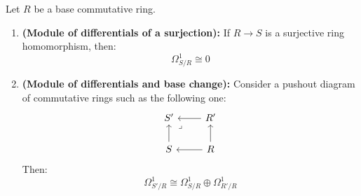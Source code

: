             \begin{proposition} \label{prop: differentials_and_finite_colimits}
                Let $R$ be a base commutative ring. 
                    \begin{enumerate}
                        \item \textbf{(Module of differentials of a surjection):} If $R \to S$ is a surjective ring homomorphism, then:
                            $$\Omega^1_{S/R} \cong 0$$
                        \item \textbf{(Module of differentials and base change):} Consider a pushout diagram of commutative rings such as the following one:
                            $$
                                \begin{tikzcd}
                                	{S'} & {R'} \\
                                	S & R
                                	\arrow[from=2-2, to=2-1]
                                	\arrow[from=2-1, to=1-1]
                                	\arrow[from=2-2, to=1-2]
                                	\arrow[from=1-2, to=1-1]
                                	\arrow["\lrcorner"{anchor=center, pos=0.125}, draw=none, from=1-1, to=2-2]
                                \end{tikzcd}
                            $$
                        Then:
                            $$\Omega^1_{S'/R} \cong \Omega^1_{S/R} \oplus \Omega^1_{R'/R}$$
                    \end{enumerate}
            \end{proposition}
